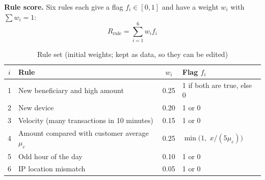 \documentclass[oneside,a4paper,12pt]{report}
\begin{document}
\textbf{Rule score.} Six rules each give a flag $f_i \in [0,1]$ and have a weight $w_i$ with $\sum w_i = 1$:
\begin{equation}
  R_{\mathrm{rule}} = \sum_{i=1}^{6} w_i f_i
\end{equation}
\begin{table}[H]
\centering\small
\begin{tabular}{|c|l|c|l|}
\hline
$i$ & Rule & $w_i$ & Flag $f_i$ \\ \hline
1 & New beneficiary and high amount & 0.25 & 1 if both are true, else 0 \\ \hline
2 & New device & 0.20 & 1 or 0 \\ \hline
3 & Velocity (many transactions in 10 minutes) & 0.15 & 1 or 0 \\ \hline
4 & Amount compared with customer average $\mu_c$ & 0.25 & $\min\bigl(1,\; x/(5\mu_c)\bigr)$ \\ \hline
5 & Odd hour of the day & 0.10 & 1 or 0 \\ \hline
6 & IP location mismatch & 0.05 & 1 or 0 \\ \hline
\end{tabular}
\caption{Rule set (initial weights; kept as data, so they can be edited)}
\end{table}
\end{document}
